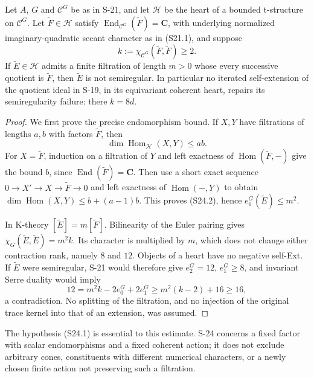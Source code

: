 \begin{proposition}
\label{prop:semireg-iterated-extensions}
Let $A$, $G$ and $\mathcal C^G$ be as in S-21, and let
$\mathcal H$ be the heart of a bounded t-structure on
$\mathcal C^G$. Let $\widetilde F\in\mathcal H$ satisfy
$\operatorname{End}_{\mathcal C^G}(\widetilde F)=\mathbf C$,
with underlying normalized imaginary-quadratic secant
character as in (S21.1), and suppose
\[
 k:=\chi_{\mathcal C^G}(\widetilde F,\widetilde F)\ge2.
 \tag{S24.1}
\]
If $\widetilde E\in\mathcal H$ admits a finite filtration
of length $m>0$ whose every successive quotient is
$\widetilde F$, then $\widetilde E$ is not semiregular.
In particular no iterated self-extension of the quotient
ideal in S-19, in its equivariant coherent heart, repairs
its semiregularity failure: there $k=8d$.
\end{proposition}
\begin{proof}
We first prove the precise endomorphism bound. If $X,Y$
have filtrations of lengths $a,b$ with factors
$\widetilde F$, then
\[
 \dim\operatorname{Hom}_{\mathcal H}(X,Y)\le ab.
 \tag{S24.2}
\]
For $X=\widetilde F$, induction on a filtration of $Y$
and left exactness of $\operatorname{Hom}(\widetilde F,-)$
give the bound $b$, since
$\operatorname{End}(\widetilde F)=\mathbf C$.
Then use a short exact sequence
$0\to X'\to X\to\widetilde F\to0$ and left exactness
of $\operatorname{Hom}(-,Y)$ to obtain
$\dim\operatorname{Hom}(X,Y)\le b+(a-1)b$.
This proves (S24.2), hence $e_0^G(\widetilde E)\le m^2$.

In K-theory $[\widetilde E]=m[\widetilde F]$.
Bilinearity of the Euler pairing gives
$\chi_G(\widetilde E,\widetilde E)=m^2k$.
Its character is multiplied by $m$, which does not
change either contraction rank, namely $8$ and $12$.
Objects of a heart have no negative self-Ext.
If $\widetilde E$ were semiregular, S-21 would therefore
give $e_2^G=12$, $e_1^G\ge8$, and invariant Serre duality
would imply
\[
 12=m^2k-2e_0^G+2e_1^G
 \ge m^2(k-2)+16\ge16,
\]
a contradiction. No splitting of the filtration, and no
injection of the original trace kernel into that of an
extension, was assumed.
\end{proof}

The hypothesis (S24.1) is essential to this estimate.
S-24 concerns a fixed factor with scalar endomorphisms and a fixed coherent
action; it does not exclude arbitrary cones, constituents
with different numerical characters, or a newly chosen
finite action not preserving such a filtration.

